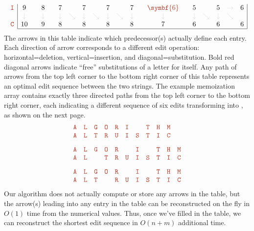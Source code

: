 \[\begin{array}{r|ccccccccccccccccccc|}
\mbox{\Str{I}} & 9 &  & 8 &  & 7 &  & 7 &  & 7 &  & 7 &  & \color{JEred}\symbf{6} &  & 5 &  & 5 & \color{JEgray}\rightarrow & 6\\
 & \color{JEgray}\downarrow &  & \color{JEgray}\downarrow &  & \color{JEgray}\downarrow & \color{JEgray}\searrow & \color{JEgray}\downarrow & \color{JEgray}\searrow & \color{JEgray}\downarrow & \color{JEgray}\searrow & \color{JEgray}\downarrow &  & \color{JEgray}\downarrow &  & \color{JEgray}\downarrow & \color{JEgray}\searrow & \color{JEgray}\downarrow & \color{JEgray}\searrow & \\
\mbox{\Str{C}} & 10 &  & 9 &  & 8 &  & 8 &  & 8 &  & 8 &  & 7 &  & 6 &  & 6 &  & 6\\
\cline{2-20}
\end{array}
\]
The arrows in this table indicate which predecessor(s) actually define each entry.
Each direction of arrow corresponds to a different edit operation: horizontal=deletion, vertical=insertion, and diagonal=substitution.
Bold red diagonal arrows indicate “free” substitutions of a letter for itself.
Any path of arrows from the top left corner to the bottom right corner of this table represents an optimal edit sequence between the two strings.
The example memoization array contains exactly three directed paths from the top left corner to the bottom right corner, each indicating a different sequence of six edits transforming  into , as shown on the next page.
\[
\begin{array}{ccccccccccc}
\mbox{\Str{A}} & \mbox{\Str{L}} & \mbox{\Str{G}} & \mbox{\Str{O}} & \mbox{\Str{R}} & \mbox{\Str{I}} & & \mbox{\Str{T}} & \mbox{\Str{H}} & \mbox{\Str{M}}\\
\mbox{\Str{A}} & \mbox{\Str{L}} & \mbox{\Str{T}} & \mbox{\Str{R}} & \mbox{\Str{U}} & \mbox{\Str{I}} & \mbox{\Str{S}} & \mbox{\Str{T}} & \mbox{\Str{I}} & \mbox{\Str{C}}\\[2ex]
\mbox{\Str{A}} & \mbox{\Str{L}} & \mbox{\Str{G}} & \mbox{\Str{O}} & \mbox{\Str{R}} & & \mbox{\Str{I}} & & \mbox{\Str{T}} & \mbox{\Str{H}} & \mbox{\Str{M}}\\
\mbox{\Str{A}} & \mbox{\Str{L}} & & \mbox{\Str{T}} & \mbox{\Str{R}} & \mbox{\Str{U}} & \mbox{\Str{I}} & \mbox{\Str{S}} & \mbox{\Str{T}} & \mbox{\Str{I}} & \mbox{\Str{C}}\\[2ex]
\mbox{\Str{A}} & \mbox{\Str{L}} & \mbox{\Str{G}} & \mbox{\Str{O}} & \mbox{\Str{R}} & & \mbox{\Str{I}} & & \mbox{\Str{T}} & \mbox{\Str{H}} & \mbox{\Str{M}}\\
\mbox{\Str{A}} & \mbox{\Str{L}} & \mbox{\Str{T}} & & \mbox{\Str{R}} & \mbox{\Str{U}} & \mbox{\Str{I}} & \mbox{\Str{S}} & \mbox{\Str{T}} & \mbox{\Str{I}} & \mbox{\Str{C}}
\end{array}
\]
Our  algorithm does not actually compute or store any arrows in the table, but the arrow(s) leading into any entry in the table can be reconstructed on the fly in $O(1)$ time from the numerical values.
Thus, once we’ve filled in the table, we can reconstruct the shortest edit sequence in $O(n+m)$ additional time.

